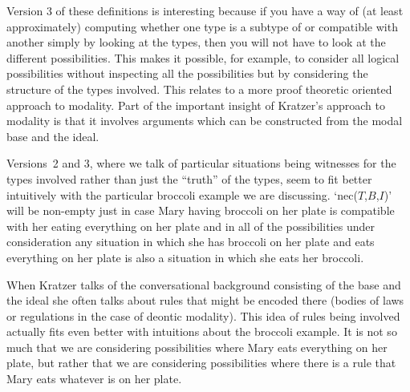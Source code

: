  
Version 3 of these definitions is interesting
because if you have a way of (at least approximately) computing
whether one type is a subtype of or compatible with another simply by looking at the
types, then you will not have to look at the different possibilities.
This makes it possible, for example, to consider all logical
possibilities without inspecting all the possibilities  but by
considering the structure of the types involved.
This relates to a more proof theoretic oriented
approach to modality.  Part of the important insight of Kratzer's
approach to modality is that it involves arguments which can be
constructed from the modal base and the ideal.

Versions~2 and 3, where we talk of particular situations being
witnesses for the types involved
rather than just the ``truth'' of the types, seem to fit better
intuitively with the particular broccoli
example we are discussing.  `nec($T$,$B$,$I$)' will be non-empty just in
case Mary having broccoli on her plate is compatible with her eating
everything on her plate and in all of the possibilities under
consideration any situation in which she has broccoli on her plate and
eats everything on her plate is also a situation in which she eats her broccoli.

When Kratzer talks of the conversational background consisting of the
base and the ideal she often talks about rules that might be encoded
there (bodies of laws or regulations in the case of deontic
modality).  This idea of rules being involved actually fits even better
with intuitions about the broccoli example.  It is not so much that we are considering
possibilities where Mary eats everything on her plate, but rather that
we are considering possibilities where there is a rule that Mary eats
whatever is on her plate.

